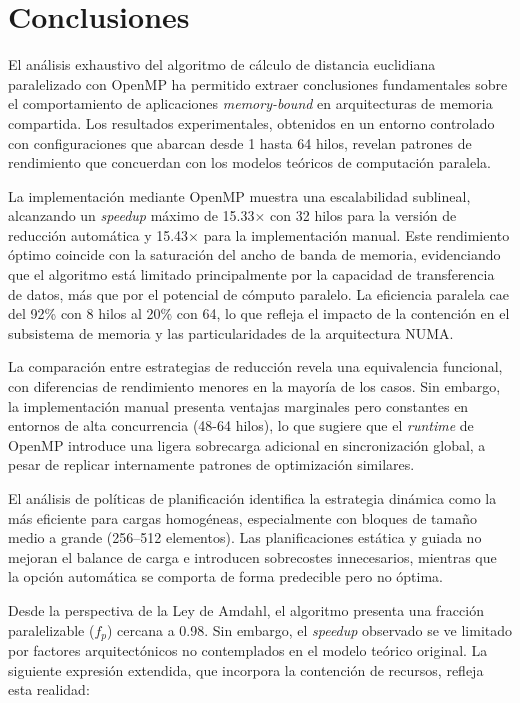\newpage

\section{Conclusiones}
    
    El análisis exhaustivo del algoritmo de cálculo de distancia euclidiana paralelizado con OpenMP ha permitido extraer conclusiones fundamentales sobre el comportamiento de aplicaciones \textit{memory-bound} en arquitecturas de memoria compartida. Los resultados experimentales, obtenidos en un entorno controlado con configuraciones que abarcan desde 1 hasta 64 hilos, revelan patrones de rendimiento que concuerdan con los modelos teóricos de computación paralela.
    
    La implementación mediante OpenMP muestra una escalabilidad sublineal, alcanzando un \textit{speedup} máximo de 15.33$\times$ con 32 hilos para la versión de reducción automática y 15.43$\times$ para la implementación manual. Este rendimiento óptimo coincide con la saturación del ancho de banda de memoria, evidenciando que el algoritmo está limitado principalmente por la capacidad de transferencia de datos, más que por el potencial de cómputo paralelo. La eficiencia paralela cae del 92\% con 8 hilos al 20\% con 64, lo que refleja el impacto de la contención en el subsistema de memoria y las particularidades de la arquitectura NUMA.
    
    La comparación entre estrategias de reducción revela una equivalencia funcional, con diferencias de rendimiento menores en la mayoría de los casos. Sin embargo, la implementación manual presenta ventajas marginales pero constantes en entornos de alta concurrencia (48-64 hilos), lo que sugiere que el \textit{runtime} de OpenMP introduce una ligera sobrecarga adicional en sincronización global, a pesar de replicar internamente patrones de optimización similares.
    
    El análisis de políticas de planificación identifica la estrategia dinámica como la más eficiente para cargas homogéneas, especialmente con bloques de tamaño medio a grande (256–512 elementos). Las planificaciones estática y guiada no mejoran el balance de carga e introducen sobrecostes innecesarios, mientras que la opción automática se comporta de forma predecible pero no óptima.
    
    Desde la perspectiva de la Ley de Amdahl, el algoritmo presenta una fracción paralelizable ($f_p$) cercana a 0.98. Sin embargo, el \textit{speedup} observado se ve limitado por factores arquitectónicos no contemplados en el modelo teórico original. La siguiente expresión extendida, que incorpora la contención de recursos, refleja esta realidad:
    
